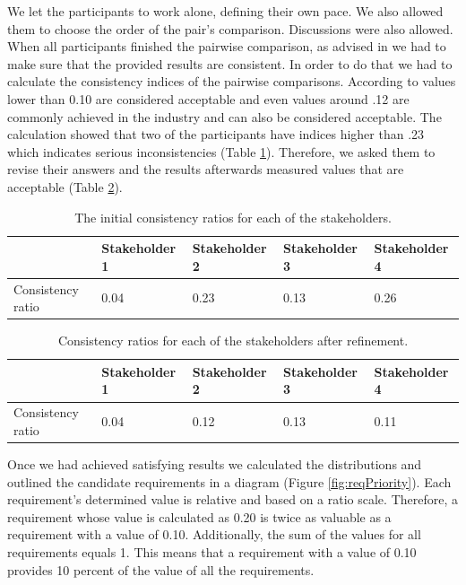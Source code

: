 We let the participants to work alone, defining their own pace. We also allowed them to choose the order of the pair's comparison. Discussions were also allowed. When all participants finished the pairwise comparison, as advised in \cite{karlsson1997cost} we had to make sure that the provided results are consistent. In order to do that we had to calculate the consistency indices of the pairwise comparisons. According to \cite{karlsson1997cost} values lower than 0.10 are considered acceptable and even values around .12 are commonly achieved in the industry and can also be considered acceptable. The calculation showed that two of the participants have indices higher than .23 which indicates serious inconsistencies (Table \ref{tbl:reqInitialConsist}). Therefore, we asked them to revise their answers and the results afterwards measured values that are acceptable (Table \ref{tbl:reqFinalConsist}).
 
 \begin{table}[h!]
  \begin{center}
    \begin{tabular}{| l | l | l | l | l |}
    \hline
    & Stakeholder 1 & Stakeholder 2 & Stakeholder 3 & Stakeholder 4 \\	 \hline
    Consistency ratio & 0.04 & 0.23 & 0.13 & 0.26 \\
    \hline
    \end{tabular}
  \end{center}
  \caption{The initial consistency ratios for each of the stakeholders.}
  \label{tbl:reqInitialConsist}
\end{table}


 \begin{table}[h!]
  \begin{center}
    \begin{tabular}{| l | l | l | l | l |}
    \hline
    & Stakeholder 1 & Stakeholder 2 & Stakeholder 3 & Stakeholder 4 \\	 \hline
    Consistency ratio & 0.04 & 0.12 & 0.13 & 0.11 \\
    \hline
    \end{tabular}
  \end{center}
  \caption{Consistency ratios for each of the stakeholders after refinement.}
  \label{tbl:reqFinalConsist}
\end{table}

Once we had achieved satisfying results we calculated the distributions and outlined the candidate requirements in a diagram (Figure \ref{fig:reqPriority}). Each requirement's determined value is relative and based on a ratio scale. Therefore, a requirement whose value is calculated as 0.20 is twice as valuable as a requirement with a value of 0.10. Additionally, the sum of the values for all requirements equals 1. This means that a requirement with a value of 0.10 provides 10 percent of the value of all the requirements.


